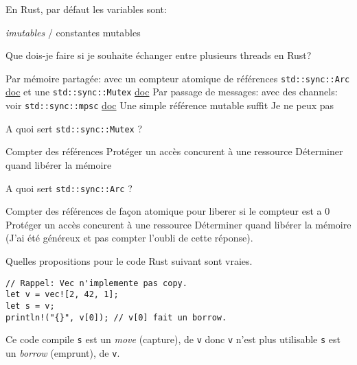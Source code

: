 \documentclass[11pt,a4paper,addpoint,answers]{exam}
\begin{document}
\begin{questions}
    \question[1] En Rust, par défaut les variables sont:
    \begin{checkboxes}
        \CorrectChoice \emph{imutables} / constantes
        \choice mutables
    \end{checkboxes}

    \question[1] Que dois-je faire si je souhaite échanger entre plusieurs threads en Rust?
    \begin{checkboxes}
        \CorrectChoice Par mémoire partagée: avec un compteur atomique de références \texttt{std::sync::Arc} \href{https://doc.rust-lang.org/std/sync/struct.Arc.html}{doc} et une \texttt{std::sync::Mutex} \href{https://doc.rust-lang.org/std/sync/struct.Mutex.html}{doc}
        \CorrectChoice Par passage de messages: avec des channels: voir \texttt{std::sync::mpsc} \href{https://doc.rust-lang.org/rust-by-example/std_misc/channels.html}{doc}
        \choice Une simple référence mutable suffit
        \choice Je ne peux pas
    \end{checkboxes}

    \question[1] A quoi sert \texttt{std::sync::Mutex} ?
    \begin{checkboxes}
        \choice Compter des références
        \CorrectChoice Protéger un accès concurent à une ressource
        \choice Déterminer quand libérer la mémoire
    \end{checkboxes}

    \question[1] A quoi sert \texttt{std::sync::Arc} ?
    \begin{checkboxes}
        \CorrectChoice Compter des références de façon atomique pour liberer si le compteur est a 0
        \choice Protéger un accès concurent à une ressource
        \CorrectChoice Déterminer quand libérer la mémoire (J'ai été généreux et pas compter l'oubli de cette réponse).
    \end{checkboxes}

    \question[1] Quelles propositions pour le code Rust suivant sont vraies.
\begin{verbatim}
// Rappel: Vec n'implemente pas copy.
let v = vec![2, 42, 1];
let s = v;
println!("{}", v[0]); // v[0] fait un borrow.
\end{verbatim}

\begin{checkboxes}
    \choice Ce code compile
    \CorrectChoice \texttt{s} est un \emph{move} (capture), de \texttt{v} donc \texttt{v} n'est plus utilisable
    \choice \texttt{s} est un \emph{borrow} (emprunt), de \texttt{v}.
\end{checkboxes}


\end{questions}
\end{document}
